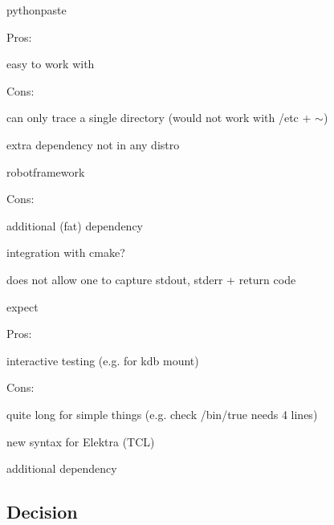 \begin{DoxyItemize}
\item pythonpaste
\begin{DoxyItemize}
\item Pros\+:
\begin{DoxyItemize}
\item easy to work with
\end{DoxyItemize}
\item Cons\+:
\begin{DoxyItemize}
\item can only trace a single directory (would not work with /etc + $\sim$)
\item extra dependency not in any distro
\end{DoxyItemize}
\end{DoxyItemize}
\item robotframework
\begin{DoxyItemize}
\item Cons\+:
\begin{DoxyItemize}
\item additional (fat) dependency
\item integration with cmake?
\item does not allow one to capture stdout, stderr + return code
\end{DoxyItemize}
\end{DoxyItemize}
\item expect
\begin{DoxyItemize}
\item Pros\+:
\begin{DoxyItemize}
\item interactive testing (e.\+g. for kdb mount)
\end{DoxyItemize}
\item Cons\+:
\begin{DoxyItemize}
\item quite long for simple things (e.\+g. check /bin/true needs 4 lines)
\item new syntax for Elektra (T\+CL)
\item additional dependency
\end{DoxyItemize}
\end{DoxyItemize}
\end{DoxyItemize}

\subsection*{Decision}

